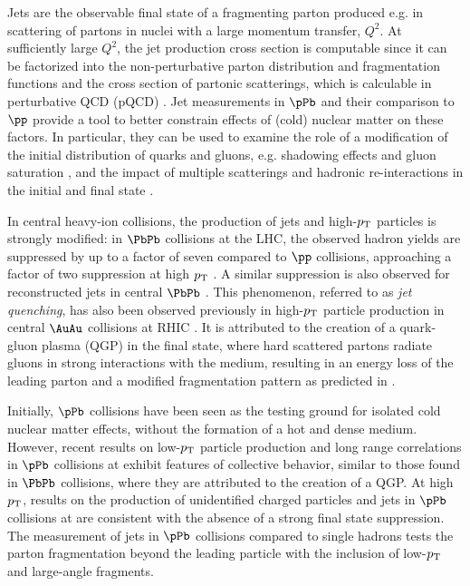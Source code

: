Jets are the observable final state of a fragmenting parton produced e.g. in scattering of partons in nuclei with a large momentum  transfer, $Q^2$.
%
At sufficiently large $Q^2$, the jet production cross section is
computable since it can be factorized into the non-perturbative parton distribution
and fragmentation functions and the  cross section of partonic scatterings, which is calculable
in perturbative QCD (pQCD) \cite{Col85a}.
%
Jet measurements in $\pPb$ and their comparison to $\pp$ provide a tool to better
constrain effects of (cold) nuclear matter on these factors.
%
In particular, they can be used to examine the role of a modification of the initial distribution
of quarks and gluons, e.g. shadowing effects and gluon
saturation \cite{McLerran:2001sr,Salgado:2011wc}, and the impact of
multiple scatterings and hadronic re-interactions in the initial and
final state \cite{Krzywicki:1979gv,Accardi:2007in}.

In central heavy-ion collisions, the production of jets and high-$p_{\mathrm{T}}$
particles is strongly modified: in $\PbPb$ collisions at the LHC, the
observed hadron yields are suppressed  by up to a factor of seven  compared
to $\pp$ collisions, approaching a factor of two suppression at high $p_{\mathrm{T}}$
\cite{Aamodt:2010jd,Aamodt:2011vg,CMS:2012aa}.
%
A similar suppression is also observed for reconstructed jets in
central $\PbPb$ \cite{Aad:2010bu,Chatrchyan:2012nia,Aad:2012vca,Abelev:2013kqa,Aad:2014bxa}.
%
This phenomenon, referred to as \emph{jet quenching}, has also been
observed previously in high-$p_{\mathrm{T}}$ particle production in central
$\AuAu$ collisions at RHIC
\cite{Adcox:2001jp,Adler:2003qi,Ada03b,Adams:2003im,Arsene:2003yk,Back:2003qr}.
%
It is attributed to the creation of a quark-gluon plasma (QGP) in the
final state, where hard scattered partons radiate gluons in strong
interactions  with the medium, resulting  in  an energy loss of the
leading parton and a modified fragmentation pattern as predicted in \cite{Gyulassy:1990ye,Baier:1994bd}.
%

Initially, $\pPb$ collisions have been seen as the testing ground for
isolated cold nuclear matter effects, without the formation of a hot and dense medium.
%
However, recent results on low-$p_{\mathrm{T}}$ particle production and long
range correlations in $\pPb$ collisions at  \cite{CMS:2012qk,Abelev:2012ola,Aad:2013fja,Abelev:2013wsa} exhibit features of collective behavior, similar to those
found in $\PbPb$ collisions, where they are attributed to the creation of a QGP.
%
At high $p_{\mathrm{T}}$, results on the production of unidentified charged
particles
\cite{ALICE:2012mj,Abelev:2014dsa,Khachatryan:2015xaa,ATLAS-CONF-2014-029}
and jets \cite{ATLAS:2014cpa,Chatrchyan:2014hqa} in $\pPb$ collisions at  are
consistent with the absence of a strong final state suppression.
%
The measurement of jets in $\pPb$ collisions compared to single hadrons tests the parton fragmentation beyond the leading particle with the inclusion of low-$p_{\mathrm{T}}$ and large-angle fragments.

